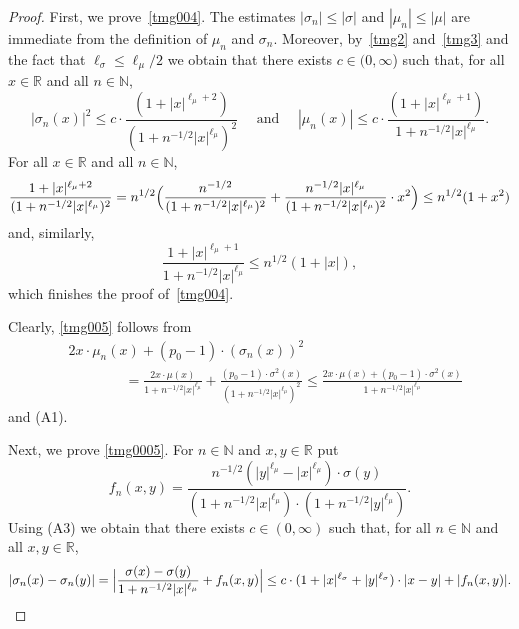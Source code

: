 \documentclass[11pt]{amsart}
\newcommand{\R}{{\mathbb R}}
\newcommand{\N}{{\mathbb N}}
\theoremstyle{plain}
\theoremstyle{definition}
\begin{document}
\begin{proof}
First, we prove~\eqref{tmg004}.  The estimates $|\sigma_n|\le |\sigma|$ and $|\mu_n|\le |\mu|$ are immediate from the definition of $\mu_n$ and $\sigma_n$. Moreover, by~\eqref{tmg2} and~\eqref{tmg3} and the fact that $\ell_\sigma \le \ell_\mu/2$ we obtain that there exists $c\in (0,\infty$) such that, for all $x\in\R$ and all $n\in\N$,
\[
|\sigma_n(x)|^2 \le c\cdot \frac{(1+|x|^{\ell_\mu+2})}{(1+n^{-1/2}|x|^{\ell_\mu})^2}\quad\text{ and }\quad |\mu_n(x)| \le c\cdot \frac{(1+|x|^{\ell_\mu+1})}{1+n^{-1/2}|x|^{\ell_\mu}}.
\]
For all $x\in\R$ and all $n\in\N$,
\[
\frac{1+|x|^{\ell_\mu+2}}{(1+n^{-1/2}|x|^{\ell_\mu})^2} =n^{1/2}\Bigl(\frac{n^{-1/2}}{(1+n^{-1/2}|x|^{\ell_\mu})^2}+\frac{n^{-1/2}|x|^{\ell_\mu}}{(1+n^{-1/2}|x|^{\ell_\mu})^2}\cdot x^2\Bigr)
\le  n^{1/2} (1  +  x^2)
\]
and, similarly,
\[
\frac{1+|x|^{\ell_\mu+1}}{1+n^{-1/2}|x|^{\ell_\mu}} \le  n^{1/2} (1  +  |x|),
\]
which finishes the proof of~\eqref{tmg004}.

Clearly, \eqref{tmg005} follows from
\begin{align*}
& 2x\cdot\mu_n(x) + (p_0-1)\cdot (\sigma_n(x))^2 \\
& \qquad\qquad  = \frac{2x\cdot\mu(x)}{1+n^{-1/2}|x|^{\ell_\mu}} + \frac{(p_0-1)\cdot\sigma^2(x)}{(1+n^{-1/2}|x|^{\ell_\mu})^2} \le \frac{2x\cdot\mu(x)+(p_0-1)\cdot\sigma^2(x) }{1+n^{-1/2}|x|^{\ell_\mu}}
\end{align*}
and (A1).


Next, we prove \eqref{tmg0005}. For $n\in\N$ and $x,y\in\R$ put
\[
f_n(x,y)=\frac{n^{-1/2}(|y|^{\ell_\mu}-|x|^{\ell_\mu})\cdot \sigma(y)}{(1+n^{-1/2}|x|^{\ell_\mu})\cdot (1+n^{-1/2}|y|^{\ell_\mu})}.
\]
Using (A3) we obtain that there exists $c\in(0, \infty)$ such that, for all $n\in\N$ and all $x,y\in\R$,
\begin{equation}\label{ly3}
|\sigma_n(x)-\sigma_n(y)|=\Bigl|\frac{\sigma(x)-\sigma(y)}{1+n^{-1/2}|x|^{\ell_\mu}}+f_n(x,y)\Bigr|\leq c\cdot (1+|x|^{\ell_{\sigma}}+|y|^{\ell_{\sigma}})\cdot |x-y|+|f_n(x,y)|.
\end{equation}


\end{proof}
\end{document}
